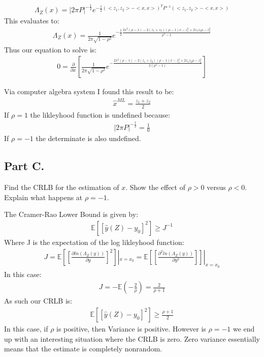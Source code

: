 \documentclass{article}
\begin{document}
\begin{align*}
\Lambda_Z (x) = |2\pi P|^{-\tfrac{1}{2}} e^{-\tfrac{1}{2} (<z_1,z_2>-<x,x>)^T P^{-1} (<z_1,z_2>-<x,x>)}
\end{align*}
This evaluates to:
\begin{align*}
\Lambda_Z (x) = \frac{1}{2\pi \sqrt{1-\rho^2}} e^{-\tfrac{1}{2} \frac{2x^2(\rho-1) - 2(z_1+z_2)(\rho-1)x - z_1^2 + 2z_1 z_2 \rho -z_2^2}{\rho^2-1}}
\end{align*}
Thus our equation to solve is:
\begin{align*}
0 = \frac{\partial}{\partial x} [ \frac{1}{2\pi \sqrt{1-\rho^2}} e^{- \frac{2x^2(\rho-1) - 2(z_1+z_2)(\rho-1)x - z_1^2 + 2z_1 z_2 \rho -z_2^2}{2(\rho^2-1)}} ]
\end{align*}

Via computer algebra system I found this result to be:
\begin{align*}
\hat{x}^{ML} = \frac{z_1+z_2}{2}
\end{align*}
If $\rho=1$ the likleyhood function is undefined because:
\begin{align*}
|2\pi P|^{-\tfrac{1}{2}} = \frac{1}{0}
\end{align*}
If $\rho=-1$ the determinate is also undefined.
\subsection*{Part C.}
Find the CRLB for the estimation of $x$. Show the effect of $\rho>0$ versus $\rho <0$. Explain what happens at $\rho=-1$.

The Cramer-Rao Lower Bound is given by:
\begin{align*}
\mathbb{E}[[\hat{y}(Z) - y_0]^2] \geq J^{-1}
\end{align*}
Where J is the expectation of the log likleyhood function:
\begin{align*}
J = \mathbb{E}[[\frac{\partial ln(\Lambda_Z(y))}{\partial y}]^2]|_{x=x_0} = \mathbb{E}[[\frac{\partial^2 ln(\Lambda_Z(y))}{\partial y^2}]]|_{x=x_0}
\end{align*}
In this case:
\begin{align*}
J= - \mathbb{E} ( -\frac{2}{\rho} ) = \frac{2}{\rho+1}
\end{align*}
As such our CRLB is:
\begin{align*}
\boxed{ \mathbb{E}[[\hat{y}(Z) - y_0]^2] \geq \frac{\rho+1}{2} }
\end{align*}
In this case, if $\rho$ is positive, then Variance is positive. However is $\rho=-1$ we end up with an interesting situation where the CRLB is zero. Zero variance essentially means that the estimate is completely nonrandom.
\clearpage
\end{document}
